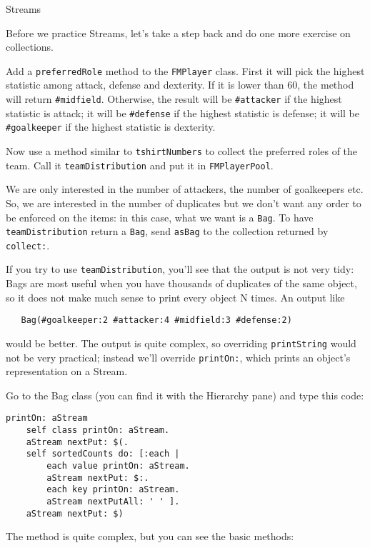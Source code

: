 \documentclass[a4paper,10pt]{scrartcl}
\begin{document}
\begin{exercise}{Streams}

Before we practice Streams, let's take a step back and do one more
exercise on collections.

Add a \verb!preferredRole! method to the \verb!FMPlayer! class.  First
it will pick the highest statistic among attack, defense and dexterity.
If it is lower than 60, the method will return \verb!#midfield!.  Otherwise,
the result will be \verb!#attacker! if the highest statistic is attack;
it will be \verb!#defense! if the highest statistic is defense;
it will be \verb!#goalkeeper! if the highest statistic is dexterity.

Now use a method similar to \verb!tshirtNumbers! to collect the preferred
roles of the team.  Call it \verb!teamDistribution! and put it in
\verb!FMPlayerPool!.

We are only interested in the number of attackers, the number of goalkeepers
etc.  So, we are interested in the number of duplicates but we don't want any
order to be enforced on the items: in this case, what we want is a \verb!Bag!.
To have \verb!teamDistribution! return a \verb!Bag!, send \verb!asBag! to
the collection returned by \verb!collect:!.

If you try to use \verb!teamDistribution!, you'll see that the output is
not very tidy: Bags are most useful when you have thousands of duplicates
of the same object, so it does not make much sense to print every object
N times.  An output like

\begin{verbatim}
   Bag(#goalkeeper:2 #attacker:4 #midfield:3 #defense:2)
\end{verbatim}

\noindent
would be better.  The output is quite complex, so overriding \verb!printString!
would not be very practical; instead we'll override \verb!printOn:!, which
prints an object's representation on a Stream.

Go to the Bag class (you can find it with the Hierarchy pane) and type this
code:

\begin{verbatim}
printOn: aStream
    self class printOn: aStream.
    aStream nextPut: $(.
    self sortedCounts do: [:each |
        each value printOn: aStream.
        aStream nextPut: $:.
        each key printOn: aStream.
        aStream nextPutAll: ' ' ].
    aStream nextPut: $)
\end{verbatim}

The method is quite complex, but you can see the basic methods:


\end{exercise}
\end{document}
